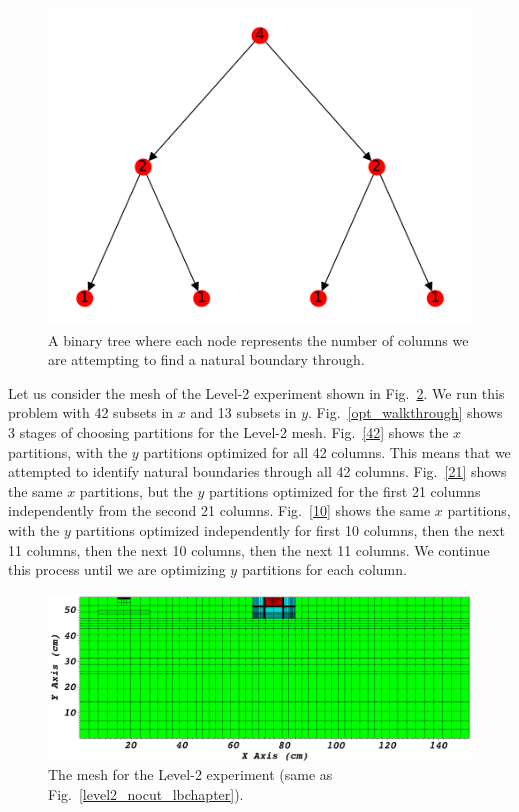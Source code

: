 \begin{figure}[h]
\centering
\includegraphics[scale=0.75]{../figures/binary_tree.pdf}
\caption{A binary tree where each node represents the number of columns we are attempting to find a natural boundary through.}
\label{binary_tree}
\end{figure}

Let us consider the mesh of the Level-2 experiment shown in Fig.~\ref{level2_nocut}.
We run this problem with 42 subsets in $x$ and 13 subsets in $y$.
Fig.~\ref{opt_walkthrough} shows 3 stages of choosing partitions for the Level-2 mesh.
Fig.~\ref{42} shows the $x$ partitions, with the $y$ partitions optimized for all 42 columns.
This means that we attempted to identify natural boundaries through all 42 columns.
Fig.~\ref{21} shows the same $x$ partitions, but the $y$ partitions optimized for the first 21 columns independently from the second 21 columns.
Fig.~\ref{10} shows the same $x$ partitions, with the $y$ partitions optimized independently for first 10 columns, then the next 11 columns, then the next 10 columns, then the next 11 columns.
We continue this process until we are optimizing $y$ partitions for each column.
\begin{figure}[h]
\centering
\includegraphics[scale=0.25]{../../figures/level2_nocut.png}
\caption{The mesh for the Level-2 experiment (same as Fig.~\ref{level2_nocut_lbchapter}).}
\label{level2_nocut}
\end{figure}

